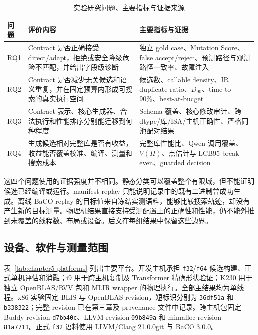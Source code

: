 \begin{table}[!htbp]
  \centering
  \caption{实验研究问题、主要指标与证据来源}
  \label{tab:chapter5-rqs}
  \begin{tabularx}{\textwidth}{
    @{}
    >{\centering\arraybackslash}p{}
    >{\raggedright\arraybackslash}p{}
    >{\raggedright\arraybackslash}X
    @{}
  }
    \toprule
    \textbf{问题} & \textbf{评价内容} & \textbf{主要指标与证据} \\
    \midrule
    RQ1 &
    Contract 是否正确接受 direct/adapt，拒绝或安全降级危险不匹配，并给出字段级诊断 &
    独立 gold case、Mutation Score、false accept/reject、预测路径与观测路径一致率、故障注入 \\
    RQ2 &
    Contract 是否减少无关候选和语义重复，并在固定预算内形成可搜索的真实执行空间 &
    候选数、callable density、IR duplicate ratio、$D_{90}$、time-to-90\%、best-at-budget \\
    RQ3 &
    Contract 表示、核心生成器、合法执行和性能排序分别能迁移到何种程度 &
    Schema 覆盖、核心修改审计、跨 dtype/库/ISA/主机正确性、严格同池配对结果 \\
    RQ4 &
    生成候选相对完整库是否有收益，收益能否覆盖校准、编译、测量和搜索成本 &
    完整库性能比、Qwen 调用覆盖、$V(H)$、点估计与 LCB95 break-even、guarded decision \\
    \bottomrule
  \end{tabularx}
\end{table}

这四个问题使用的证据强度并不相同。静态分类可以覆盖整个有限域，但不能证明候选已经编译或运行。manifest replay 只能说明记录中的既有二进制曾成功生成。离线 BaCO replay 的目标值来自冻结实测语料，能够比较搜索轨迹，却没有产生新的目标测量。物理机结果直接支持受测配置上的正确性和性能，仍不能外推到未覆盖的线程数、布局或设备。后文在每组结果中保留这些边界。

\subsection{设备、软件与测量范围}

表~\ref{tab:chapter5-platforms} 列出主要平台。开发主机承担 \texttt{f32}/\texttt{f64} 候选构建、正式单机评估和消融；i9 用于跨主机复制及 Transformer 精确形状验证；K230 用于独立 OpenBLAS/RVV 包和 MLIR wrapper 的物理执行。全部主结果均为单线程。x86 实验固定 BLIS 与 OpenBLAS revision，短标识分别为 \texttt{36df51a} 和 \texttt{b338322}；完整 revision 已在第三章及 provenance 文件中记录。跨主机包固定 Buddy revision \texttt{d7bb40c}、LLVM revision \texttt{09b849a} 和 mimalloc revision \texttt{81a7711}。正式 \texttt{f32} 语料使用 LLVM/Clang 21.0.0git 与 BaCO 3.0.0。


